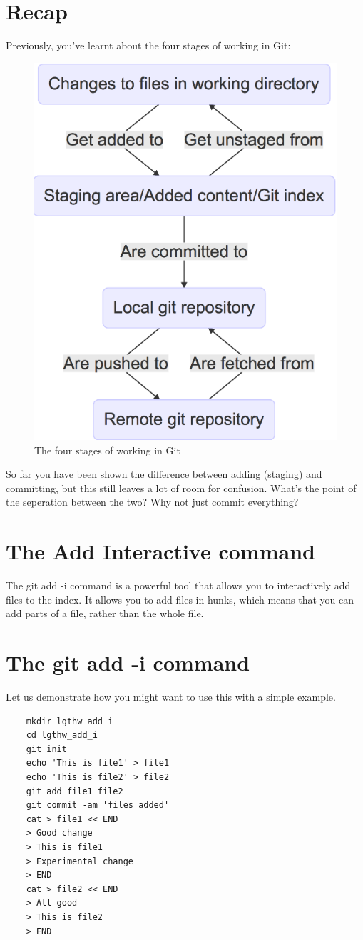 \documentclass{report}
\begin{document}
\section{Recap}

Previously, you've learnt about the four stages of working in Git:

\begin{figure}[ht]
    \centering
    \includegraphics[width=0.3 \linewidth]{Photos/interactive-1.png}
    \caption[short]{The four stages of working in Git}
    \label{fig:interactive-1}
\end{figure}

So far you have been shown the difference between adding (staging) and committing, but this still leaves a lot of room for confusion. What's the point of the seperation between the two? Why not just commit everything?

\section{The Add Interactive command}

The git add -i command is a powerful tool that allows you to interactively add files to the index. It allows you to add files in hunks, which means that you can add parts of a file, rather than the whole file.

\section{The git add -i command}

Let us demonstrate how you might want to use this with a simple example.

\begin{lstlisting}
    mkdir lgthw_add_i
    cd lgthw_add_i
    git init
    echo 'This is file1' > file1
    echo 'This is file2' > file2
    git add file1 file2
    git commit -am 'files added'
    cat > file1 << END
    > Good change
    > This is file1
    > Experimental change
    > END
    cat > file2 << END
    > All good
    > This is file2
    > END
\end{lstlisting}
\end{document}
